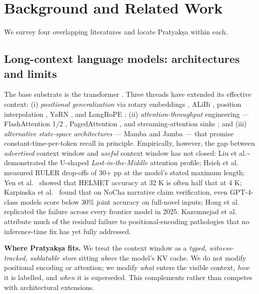 \section{Background and Related Work}\label{background-and-related-work}

We survey four overlapping literatures and locate Pratyakṣa within each.

\subsection{Long-context language models: architectures and limits}\label{long-context-language-models-architectures-and-limits}

The base substrate is the transformer \citep{vaswani2017attention}. Three threads have extended its effective context: (i) \emph{positional generalization} via rotary embeddings \citep{su2021roformer}, ALiBi \citep{press2022alibi}, position interpolation \citep{chen2023pi}, YaRN \citep{peng2023yarn}, and LongRoPE \citep{ding2024longrope}; (ii) \emph{attention-throughput} engineering --- FlashAttention 1/2 \citep{dao2022flashattention, dao2023flashattention2}, PagedAttention \citep{kwon2023vllm}, and streaming-attention sinks \citep{xiao2023streamingllm}; and (iii) \emph{alternative state-space architectures} --- Mamba \citep{gu2023mamba} and Jamba \citep{lieber2024jamba} --- that promise constant-time-per-token recall in principle. Empirically, however, the gap between \emph{advertised} context window and \emph{useful} context window has not closed: Liu et al.\textasciitilde{}\citeyearpar{liu2023lostmiddle} demonstrated the U-shaped \emph{Lost-in-the-Middle} attention profile; Hsieh et al.~\citeyearpar{hsieh2024ruler} measured RULER drop-offs of 30+ pp at the model's stated maximum length; Yen et al.~\citeyearpar{yen2024helmet} showed that HELMET accuracy at 32 K is often half that at 4 K; Karpinska et al.~\citeyearpar{karpinska2024nocha} found that on NoCha narrative claim verification, even GPT-4-class models score below 30\% joint accuracy on full-novel inputs; Hong et al.~\citeyearpar{hong2025contextrot} replicated the failure across every frontier model in 2025. Kazemnejad et al.~\citeyearpar{kazemnejad2024impact} attribute much of the residual failure to positional-encoding pathologies that no inference-time fix has yet fully addressed.

\textbf{Where Pratyakṣa fits.} We treat the context window as a \emph{typed, witness-tracked, sublatable store} sitting \emph{above} the model's KV cache. We do not modify positional encoding or attention; we modify \emph{what} enters the visible context, \emph{how} it is labelled, and \emph{when} it is superseded. This complements rather than competes with architectural extensions.

